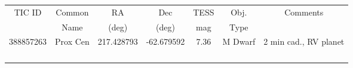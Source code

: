 \documentclass[letterpaper,11pt]{article}
\begin{document}
\begin{center}
\begin{tabular}{ | c | c | c | c | c | c | c | }
\hline
TIC ID          &      Common      &     RA             &      Dec          &      TESS       &       Obj.        &      Comments \\
                    &      Name           &     (deg)          &      (deg)        &      mag         &       Type       &                         \\
\hline
\hline
388857263  &  Prox Cen          &  217.428793  &  -62.679592  &  7.36             &    M Dwarf    & 2 min cad., RV planet \\ \hline
                    &                           &                       &                      &                      &                     &                                     \\ \hline
                    &                           &                       &                      &                      &                     &                                     \\ \hline
                    &                           &                       &                      &                      &                     &                                     \\ \hline
                    &                           &                       &                      &                      &                     &                                     \\ \hline
\end{tabular}
\end{center}

\end{document}
